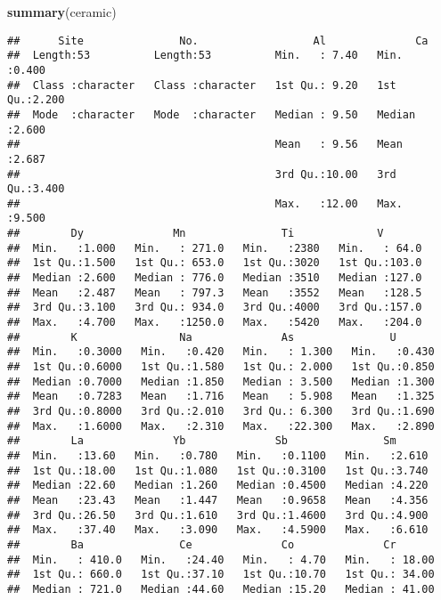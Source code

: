 \documentclass[]{article}
\newenvironment{Shaded}{\begin{snugshade}}{\end{snugshade}}
\newcommand{\KeywordTok}[1]{\textcolor[rgb]{0.13,0.29,0.53}{\textbf{#1}}}
\newcommand{\NormalTok}[1]{#1}
\begin{document}
\begin{Shaded}
\begin{Highlighting}[]
\KeywordTok{summary}\NormalTok{(ceramic)}
\end{Highlighting}
\end{Shaded}

\begin{verbatim}
##      Site               No.                  Al              Ca       
##  Length:53          Length:53          Min.   : 7.40   Min.   :0.400  
##  Class :character   Class :character   1st Qu.: 9.20   1st Qu.:2.200  
##  Mode  :character   Mode  :character   Median : 9.50   Median :2.600  
##                                        Mean   : 9.56   Mean   :2.687  
##                                        3rd Qu.:10.00   3rd Qu.:3.400  
##                                        Max.   :12.00   Max.   :9.500  
##        Dy              Mn               Ti             V        
##  Min.   :1.000   Min.   : 271.0   Min.   :2380   Min.   : 64.0  
##  1st Qu.:1.500   1st Qu.: 653.0   1st Qu.:3020   1st Qu.:103.0  
##  Median :2.600   Median : 776.0   Median :3510   Median :127.0  
##  Mean   :2.487   Mean   : 797.3   Mean   :3552   Mean   :128.5  
##  3rd Qu.:3.100   3rd Qu.: 934.0   3rd Qu.:4000   3rd Qu.:157.0  
##  Max.   :4.700   Max.   :1250.0   Max.   :5420   Max.   :204.0  
##        K                Na              As               U        
##  Min.   :0.3000   Min.   :0.420   Min.   : 1.300   Min.   :0.430  
##  1st Qu.:0.6000   1st Qu.:1.580   1st Qu.: 2.000   1st Qu.:0.850  
##  Median :0.7000   Median :1.850   Median : 3.500   Median :1.300  
##  Mean   :0.7283   Mean   :1.716   Mean   : 5.908   Mean   :1.325  
##  3rd Qu.:0.8000   3rd Qu.:2.010   3rd Qu.: 6.300   3rd Qu.:1.690  
##  Max.   :1.6000   Max.   :2.310   Max.   :22.300   Max.   :2.890  
##        La              Yb              Sb               Sm       
##  Min.   :13.60   Min.   :0.780   Min.   :0.1100   Min.   :2.610  
##  1st Qu.:18.00   1st Qu.:1.080   1st Qu.:0.3100   1st Qu.:3.740  
##  Median :22.60   Median :1.260   Median :0.4500   Median :4.220  
##  Mean   :23.43   Mean   :1.447   Mean   :0.9658   Mean   :4.356  
##  3rd Qu.:26.50   3rd Qu.:1.610   3rd Qu.:1.4600   3rd Qu.:4.900  
##  Max.   :37.40   Max.   :3.090   Max.   :4.5900   Max.   :6.610  
##        Ba               Ce              Co              Cr        
##  Min.   : 410.0   Min.   :24.40   Min.   : 4.70   Min.   : 18.00  
##  1st Qu.: 660.0   1st Qu.:37.10   1st Qu.:10.70   1st Qu.: 34.00  
##  Median : 721.0   Median :44.60   Median :15.20   Median : 41.00  

\end{verbatim}
\end{document}
